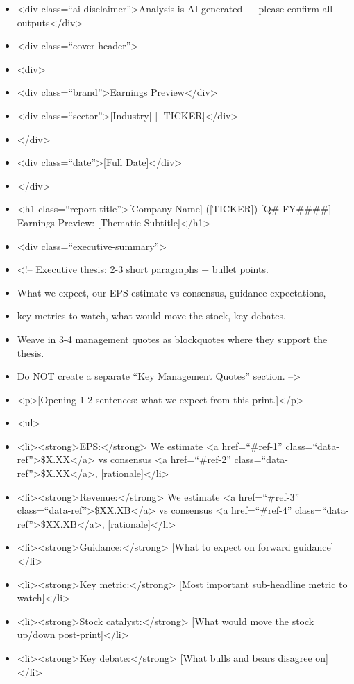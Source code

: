 \documentclass[11pt]{article}
\begin{document}
\begin{itemize}[leftmargin=*,itemsep=2pt,topsep=2pt]
\item {} <div class=``ai-disclaimer''>Analysis is AI-generated — please confirm all outputs</div>
\item {} <div class=``cover-header''>
\item {} <div>
\item {} <div class=``brand''>Earnings Preview</div>
\item {} <div class=``sector''>[Industry] | [TICKER]</div>
\item {} </div>
\item {} <div class=``date''>[Full Date]</div>
\item {} </div>
\item {} <h1 class=``report-title''>[Company Name] ([TICKER]) [Q\# FY\#\#\#\#] Earnings Preview: [Thematic Subtitle]</h1>
\item {} <div class=``executive-summary''>
\item {} <!-- Executive thesis: 2-3 short paragraphs + bullet points.
\item {} What we expect, our EPS estimate vs consensus, guidance expectations,
\item {} key metrics to watch, what would move the stock, key debates.
\item {} Weave in 3-4 management quotes as blockquotes where they support the thesis.
\item {} Do NOT create a separate ``Key Management Quotes'' section. -->
\item {} <p>[Opening 1-2 sentences: what we expect from this print.]</p>
\item {} <ul>
\item {} <li><strong>EPS:</strong> We estimate <a href=``\#ref-1'' class=``data-ref''>\$X.XX</a> vs consensus <a href=``\#ref-2'' class=``data-ref''>\$X.XX</a>, [rationale]</li>
\item {} <li><strong>Revenue:</strong> We estimate <a href=``\#ref-3'' class=``data-ref''>\$XX.XB</a> vs consensus <a href=``\#ref-4'' class=``data-ref''>\$XX.XB</a>, [rationale]</li>
\item {} <li><strong>Guidance:</strong> [What to expect on forward guidance]</li>
\item {} <li><strong>Key metric:</strong> [Most important sub-headline metric to watch]</li>
\item {} <li><strong>Stock catalyst:</strong> [What would move the stock up/down post-print]</li>
\item {} <li><strong>Key debate:</strong> [What bulls and bears disagree on]</li>

\end{itemize}
\end{document}
